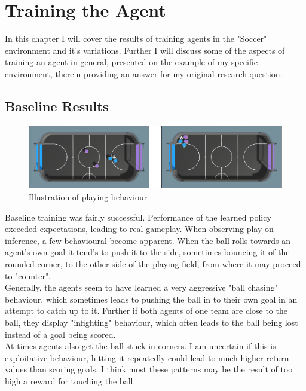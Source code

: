 \chapter{Training the Agent}\label{chap:training}
In this chapter I will cover the results of training agents in the "Soccer" environment and it's variations. Further I will discuss some of the aspects of training an agent in general, presented on the example of my specific environment, therein providing an answer for my original research question.
\nolinebreak 
\section{Baseline Results}\label{sec:tr:baseline_results}

\begin{figure}[H]
    \centering
    \includegraphics[width=0.7\linewidth]{figures/baseline.png}
    \caption{Illustration of playing behaviour}
    \label{fig:base_returns}
\end{figure}
\noindent
Baseline training was fairly successful. Performance of the learned policy exceeded expectations, leading to real gameplay. When observing play on inference, a few behavioural become apparent. When the ball rolls towards an agent's own goal it tend's to push it to the side, sometimes bouncing it of the rounded corner, to the other side of the playing field, from where it may proceed to "counter". 
\\ Generally, the agents seem to have learned a very aggressive "ball chasing" behaviour, which sometimes leads to pushing the ball in to their own goal in an attempt to catch up to it. Further if both agents of one team are close to the ball, they display "infighting" behaviour, which often leads to the ball being lost instead of a goal being scored.
\\At times agents also get the ball stuck in corners. I am uncertain if this is exploitative behaviour, hitting it repeatedly could lead to much higher return values than scoring goals. I think most these patterns may be the result of too high a reward for touching the ball. 

